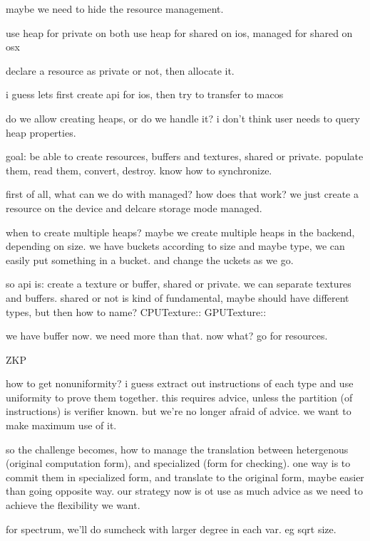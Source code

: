 

maybe we need to hide the resource management. 

use heap for private on both
use heap for shared on ios, managed for shared on osx

declare a resource as private or not, then allocate it. 

i guess lets first create api for ios, then try to transfer to macos


do we allow creating heaps, or do we handle it?
i don't think user needs to query heap properties. 


goal:
be able to create resources, buffers and textures, shared or private.
populate them, read them, convert, destroy. 
know how to synchronize.


first of all, what can we do with managed? how does that work?
we just create a resource on the device and delcare storage mode managed.


when to create multiple heaps?
maybe we create multiple heaps in the backend, depending on size. we have buckets according to size and maybe type, we can easily put something in a bucket. and change the uckets as we go.

so api is:
create a texture or buffer, shared or private. we can separate textures and buffers. shared or not is kind of fundamental, maybe should have different types, but then how to name?
CPUTexture::
GPUTexture::


we have buffer now. we need more than that. 
now what? go for resources. 



ZKP

how to get nonuniformity?
i guess extract out instructions of each type and use uniformity to prove them together.
this requires advice, unless the partition (of instructions) is verifier known. 
but we're no longer afraid of advice. we want to make maximum use of it. 

so the challenge becomes, how to manage the translation between hetergenous (original computation form), and specialized (form for checking).
one way is to commit them in specialized form, and translate to the original form, maybe easier than going opposite way.
our strategy now is ot use as much advice as we need to achieve the flexibility we want. 

for spectrum, we'll do sumcheck with larger degree in each var. eg sqrt size. 






